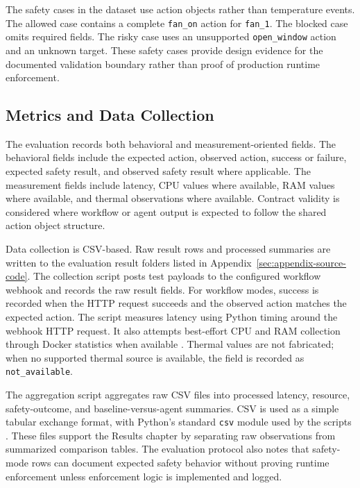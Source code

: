 The safety cases in the dataset use action objects rather than temperature events. The allowed case contains a complete \texttt{fan\_on} action for \texttt{fan\_1}. The blocked case omits required fields. The risky case uses an unsupported \texttt{open\_window} action and an unknown target. These safety cases provide design evidence for the documented validation boundary rather than proof of production runtime enforcement.

\subsection{Metrics and Data Collection}\label{subsec:metrics-data-collection}

The evaluation records both behavioral and measurement-oriented fields. The behavioral fields include the expected action, observed action, success or failure, expected safety result, and observed safety result where applicable. The measurement fields include latency, CPU values where available, RAM values where available, and thermal observations where available. Contract validity is considered where workflow or agent output is expected to follow the shared action object structure.

Data collection is CSV-based. Raw result rows and processed summaries are written to the evaluation result folders listed in Appendix~\ref{sec:appendix-source-code}. The collection script posts test payloads to the configured workflow webhook and records the raw result fields. For workflow modes, success is recorded when the HTTP request succeeds and the observed action matches the expected action. The script measures latency using Python timing around the webhook HTTP request. It also attempts best-effort CPU and RAM collection through Docker statistics when available \cite{dockerStatsDocs}. Thermal values are not fabricated; when no supported thermal source is available, the field is recorded as \texttt{not\_available}.

The aggregation script aggregates raw CSV files into processed latency, resource, safety-outcome, and baseline-versus-agent summaries. CSV is used as a simple tabular exchange format, with Python's standard \texttt{csv} module used by the scripts \cite{csvRfc4180,pythonCsvDocs}. These files support the Results chapter by separating raw observations from summarized comparison tables. The evaluation protocol also notes that safety-mode rows can document expected safety behavior without proving runtime enforcement unless enforcement logic is implemented and logged.

